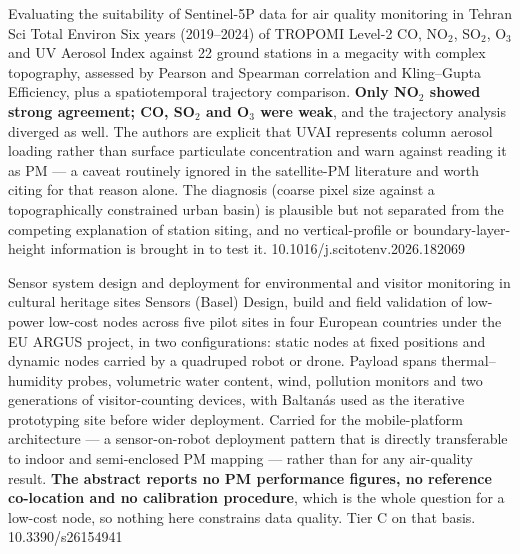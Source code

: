 \documentclass[10pt]{article}
\begin{document}
{Evaluating the suitability of Sentinel-5P data for air quality monitoring in Tehran}
{Sci Total Environ}
{Six years (2019--2024) of TROPOMI Level-2 CO, NO$_2$, SO$_2$, O$_3$ and UV Aerosol Index
against 22 ground stations in a megacity with complex topography, assessed by Pearson and
Spearman correlation and Kling--Gupta Efficiency, plus a spatiotemporal trajectory
comparison. \textbf{Only NO$_2$ showed strong agreement; CO, SO$_2$ and O$_3$ were weak},
and the trajectory analysis diverged as well. The authors are explicit that UVAI represents
column aerosol loading rather than surface particulate concentration and warn against
reading it as PM --- a caveat routinely ignored in the satellite-PM literature and worth
citing for that reason alone. The diagnosis (coarse pixel size against a topographically
constrained urban basin) is plausible but not separated from the competing explanation of
station siting, and no vertical-profile or boundary-layer-height information is brought in
to test it.}
{10.1016/j.scitotenv.2026.182069}

{Sensor system design and deployment for environmental and visitor monitoring in cultural heritage sites}
{Sensors (Basel)}
{Design, build and field validation of low-power low-cost nodes across five pilot sites in
four European countries under the EU ARGUS project, in two configurations: static nodes at
fixed positions and dynamic nodes carried by a quadruped robot or drone. Payload spans
thermal--humidity probes, volumetric water content, wind, pollution monitors and two
generations of visitor-counting devices, with Baltan\'as used as the iterative prototyping
site before wider deployment. Carried for the mobile-platform architecture --- a
sensor-on-robot deployment pattern that is directly transferable to indoor and
semi-enclosed PM mapping --- rather than for any air-quality result. \textbf{The abstract
reports no PM performance figures, no reference co-location and no calibration procedure},
which is the whole question for a low-cost node, so nothing here constrains data quality.
Tier C on that basis.}
{10.3390/s26154941}

\end{document}
